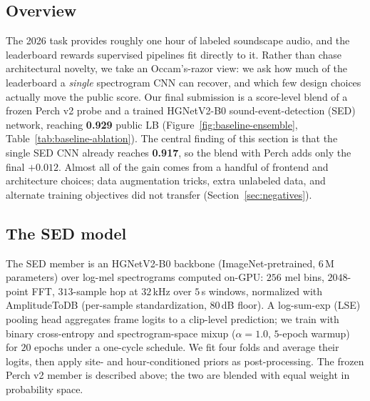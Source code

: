 
\subsection{Overview}

The 2026 task provides roughly one hour of labeled soundscape audio, and the leaderboard rewards
supervised pipelines fit directly to it.
Rather than chase architectural novelty, we take an Occam's-razor view: we ask how much of the
leaderboard a \emph{single} spectrogram CNN can recover, and which few design choices actually
move the public score.
Our final submission is a score-level blend of a frozen Perch v2 \cite{hamer2025perch2} probe and
a trained HGNetV2-B0 sound-event-detection (SED) network, reaching \textbf{0.929} public LB
(Figure~\ref{fig:baseline-ensemble}, Table~\ref{tab:baseline-ablation}).
The central finding of this section is that the single SED CNN already reaches \textbf{0.917}, so
the blend with Perch adds only the final \textbf{$+0.012$}.
Almost all of the gain comes from a handful of frontend and architecture choices; data
augmentation tricks, extra unlabeled data, and alternate training objectives did not transfer
(Section~\ref{sec:negatives}).

\subsection{The SED model}

The SED member is an HGNetV2-B0 backbone (ImageNet-pretrained, $6$\,M parameters) over log-mel
spectrograms computed on-GPU: $256$ mel bins, $2048$-point FFT, $313$-sample hop at $32$\,kHz over
$5$\,s windows, normalized with AmplitudeToDB (per-sample standardization, $80$\,dB floor).
A log-sum-exp (LSE) pooling head aggregates frame logits to a clip-level prediction; we train with
binary cross-entropy and spectrogram-space mixup ($\alpha{=}1.0$, $5$-epoch warmup) for $20$ epochs
under a one-cycle schedule.
We fit four folds and average their logits, then apply site- and hour-conditioned priors as
post-processing.
The frozen Perch v2 member is described above; the two are blended with equal weight in
probability space.

